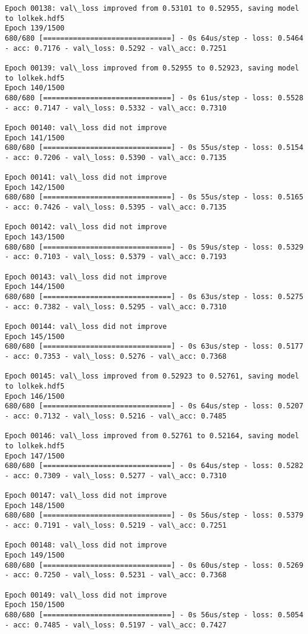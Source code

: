 \documentclass[11pt]{article}
\begin{document}
\begin{Verbatim}[commandchars=\\\{\}]
Epoch 00138: val\_loss improved from 0.53101 to 0.52955, saving model to lolkek.hdf5
Epoch 139/1500
680/680 [==============================] - 0s 64us/step - loss: 0.5464 - acc: 0.7176 - val\_loss: 0.5292 - val\_acc: 0.7251

Epoch 00139: val\_loss improved from 0.52955 to 0.52923, saving model to lolkek.hdf5
Epoch 140/1500
680/680 [==============================] - 0s 61us/step - loss: 0.5528 - acc: 0.7147 - val\_loss: 0.5332 - val\_acc: 0.7310

Epoch 00140: val\_loss did not improve
Epoch 141/1500
680/680 [==============================] - 0s 55us/step - loss: 0.5154 - acc: 0.7206 - val\_loss: 0.5390 - val\_acc: 0.7135

Epoch 00141: val\_loss did not improve
Epoch 142/1500
680/680 [==============================] - 0s 55us/step - loss: 0.5165 - acc: 0.7426 - val\_loss: 0.5395 - val\_acc: 0.7135

Epoch 00142: val\_loss did not improve
Epoch 143/1500
680/680 [==============================] - 0s 59us/step - loss: 0.5329 - acc: 0.7103 - val\_loss: 0.5379 - val\_acc: 0.7193

Epoch 00143: val\_loss did not improve
Epoch 144/1500
680/680 [==============================] - 0s 63us/step - loss: 0.5275 - acc: 0.7382 - val\_loss: 0.5295 - val\_acc: 0.7310

Epoch 00144: val\_loss did not improve
Epoch 145/1500
680/680 [==============================] - 0s 63us/step - loss: 0.5177 - acc: 0.7353 - val\_loss: 0.5276 - val\_acc: 0.7368

Epoch 00145: val\_loss improved from 0.52923 to 0.52761, saving model to lolkek.hdf5
Epoch 146/1500
680/680 [==============================] - 0s 64us/step - loss: 0.5207 - acc: 0.7132 - val\_loss: 0.5216 - val\_acc: 0.7485

Epoch 00146: val\_loss improved from 0.52761 to 0.52164, saving model to lolkek.hdf5
Epoch 147/1500
680/680 [==============================] - 0s 64us/step - loss: 0.5282 - acc: 0.7309 - val\_loss: 0.5277 - val\_acc: 0.7310

Epoch 00147: val\_loss did not improve
Epoch 148/1500
680/680 [==============================] - 0s 56us/step - loss: 0.5379 - acc: 0.7191 - val\_loss: 0.5219 - val\_acc: 0.7251

Epoch 00148: val\_loss did not improve
Epoch 149/1500
680/680 [==============================] - 0s 60us/step - loss: 0.5269 - acc: 0.7250 - val\_loss: 0.5231 - val\_acc: 0.7368

Epoch 00149: val\_loss did not improve
Epoch 150/1500
680/680 [==============================] - 0s 56us/step - loss: 0.5054 - acc: 0.7485 - val\_loss: 0.5197 - val\_acc: 0.7427


\end{Verbatim}
\end{document}
